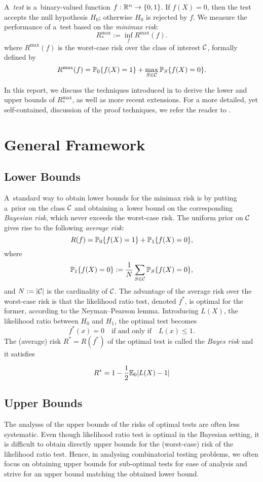 \documentclass[10pt, oneside]{article}
\begin{document}
A~\textit{test} is a~binary-valued function $f:{\mathbb R}^n \to\{
0,1\}$. If
$f(X)=0$, then the test accepts the null hypothesis $H_0$;
otherwise $H_0$ is rejected by $f$.
We measure the performance of a~test based on the \textit{minimax risk}:
\[
R_*^{\max} := \inf_{f} R^{\max}(f).
\]
where $R^{\max}(f)$ is the worst-case risk over the class of interest ${\mathcal C}$, formally defined by
\[
R^{\max}(f) = \mathbb{P}_0\{f(X)=1\}
+ \max_{S\in{\mathcal C}} \mathbb{P}_S\{f(X)=0\}.
\]

In this report, we discuss the techniques introduced in \cite{arias2012correlation, addario2010combinatorial, arias2011detection} to derive the lower and upper bounds of $R_*^{\max}$, as well as more recent extensions. For a more detailed, yet self-contained, discussion of the proof techniques, we refer the reader to \cite{lugosi2017lectures}.

\section{General Framework}

\subsection{Lower Bounds}
A~standard way to obtain lower bounds for the minimax risk is by putting a~prior on the class ${\mathcal C}$ and obtaining a~lower bound on the corresponding \textit{Bayesian risk}, which never exceeds the worst-case risk. The
uniform prior on ${\mathcal C}$ gives rise to the following \textit{average risk}:
\[
R(f) = \mathbb{P}_0\{f(X)=1\}
+ \mathbb{P}_1\{f(X)=0\},
\]
where
\[
\mathbb{P}_1\{f(X)=0\} := \frac{1}{N}\sum_{S\in{\mathcal C}} \mathbb{P}_S\{f(X)=0\},
\]
and $N := |{\mathcal C}|$ is the cardinality of ${\mathcal C}$.
The advantage of the average risk over the worst-case risk is that the likelihood ratio test, denoted $f^*$, is optimal for the former, according to the Neyman--Pearson lemma. Introducing $L(X)$, the likelihood ratio between $H_0$ and $H_1$, the optimal test becomes
%
\[
f^*(x) = 0  \quad\mbox{if and only if}\quad   L(x) \le 1.
\]
The
(average)
risk $R^*=R(f^*)$ of the optimal test is called the
\textit{Bayes risk} and it satisfies

\[
R^* = 1 - \frac{1}{2} \mathbb{E}_0 |L(X) - 1|
\]

\subsection{Upper Bounds}
The analysss of the upper bounds of the risks of optimal tests are often less systematic. Even though likelihood ratio test is optimal in the
Bayesian setting, it is difficult to obtain directly upper bounds for the (worst-case) risk
of the likelihood ratio test. Hence, in analysing combinatorial testing problems, we often focus on obtaining upper bounds for sub-optimal tests for ease of analysis and strive for an upper bound matching the obtained lower bound.
\end{document}
